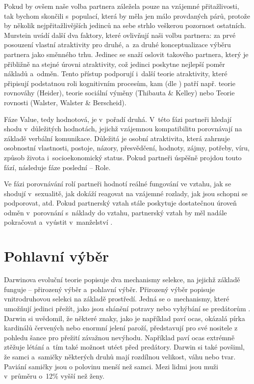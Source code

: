 \documentclass[a4paper, 12pt, notitlepage, oneside, numbers=noenddot]{report}
\begin{document}
Pokud by ovšem naše volba partnera záležela pouze na vzájemné
přitažlivosti, tak bychom skončili s~populací, která by měla jen málo
provdaných párů, protože by několik nejpřitažlivějších jedinců na sebe
strhlo veškerou pozornost ostatních.  Murstein uvádí další dva
faktory, které ovlivňují naši volbu partnera: za prvé posouzení
vlastní at\-rak\-ti\-vi\-ty pro druhé, a~za druhé konceptualizace výběru
partnera jako směnného trhu. Jedinec se snaží oslovit takového
partnera, který je přibližně na stejné úrovni atraktivity, což jedinci
poskytne nejlepší poměr nákladů a~odměn. Tento přístup podporují
i~další teorie atraktivity, které připisují podstatnou roli
kognitivním procesům, kam (dle \citealp{Slamenik2008}) patří
např. teorie rovnováhy (Heider), teorie sociální výměny (Thibauta \&
Kelley) nebo Teorie rovnosti (Walster, Walster \& Berscheid).

Fáze Value, tedy hodnotová, je v~pořadí druhá.  V~této fázi partneři
hledají shodu v~dů\-le\-ži\-tých hodnotách, jejichž vzájemnou
kompatibilitu porovnávají na základě verbální komunikace.  Důležitá je
osobní atraktivita, která zahrnuje osobnostní vlastnosti, postoje,
názory, přesvědčení, hodnoty, zájmy, potřeby, víru, způsob života
i~socioekonomický status.  Pokud partneři úspěšně projdou touto fází,
následuje fáze poslední -- Role.

Ve fázi porovnávání rolí partneři hodnotí reálné fungování ve vztahu,
jak se shodují v~sexualitě, jak dokáží reagovat na vzájemné rozlady,
jak jsou schopni se podporovat, atd.  Pokud partnerský vztah stále
poskytuje dostatečnou úroveň odměn v~porovnání s~náklady do vztahu,
partnerský vztah by měl nadále pokračovat a~vyústit v~manželství
\citep{Murstein1970}.

\section{Pohlavní výběr}
Darwinova evoluční teorie popisuje dva mechanismy selekce, na jejichž
základě funguje -- přirozený výběr a~pohlavní výběr.  Přirozený výběr
popisuje vnitrodruhovou selekci na základě prostředí.  Jedná se
o~mechanismy, které umožňují jedinci přežít, jako jsou shánění potravy
nebo vyhýbání se predátorům \citep{Darwin2005, Buss2007}.  Darwin si
uvědomil, že některé znaky, jako je například paví ocas, okázalá pírka
kardinálů červených nebo enormní jelení paroží, představují pro své
nositele z pohledu šance pro přežití závažnou nevýhodu.  Například paví
ocas extrémně ztěžuje létání a~tím také možnost utéct před predátory.
Darwin si také povšiml, že samci a~samičky některých druhů mají
rozdílnou velikost, váhu nebo tvar.  Paviání samičky jsou o polovinu
menší než samci.  Mezi lidmi jsou muži v~průměru o~12\% vyšší než
ženy.
\end{document}
